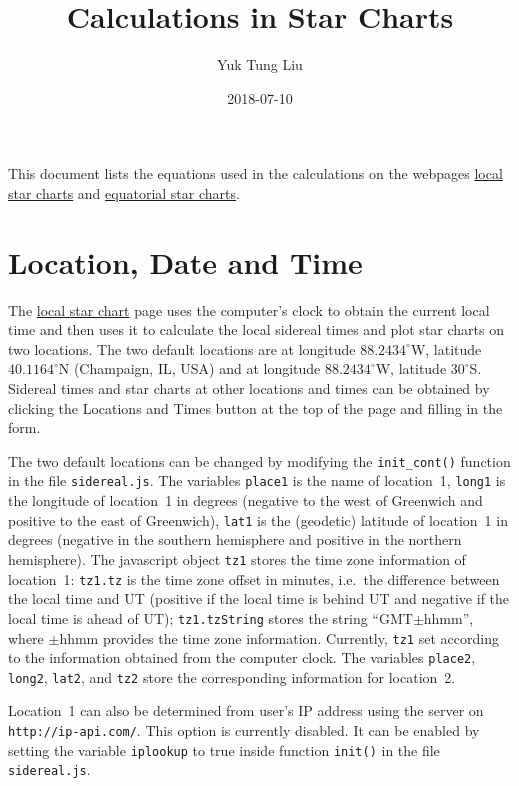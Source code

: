\documentclass[12pt]{article}
\begin{document}
\title{Calculations in Star Charts}
\author{Yuk Tung Liu}
\date{2018-07-10}
\maketitle

This document lists the equations used in the calculations 
on the webpages \href{../sidereal.html}{local star charts} and 
\href{../chartGCRS.html}{equatorial star charts}. 

\section{Location, Date and Time}

The \href{../sidereal.html}{local star chart} page uses the computer's 
clock to obtain the current local time and then uses it to calculate 
the local sidereal times and plot star charts on two locations. 
The two default locations are at longitude $88.2434^\circ$W, 
latitude $40.1164^\circ$N (Champaign, IL, USA) and at longitude $88.2434^\circ$W, 
latitude $30^\circ$S. Sidereal times and star charts at other locations 
and times can be obtained by clicking the Locations and Times button 
at the top of the page and filling in the form. 

The two default locations can be changed by modifying the {\tt init\_cont()} 
function in the file {\tt sidereal.js}. The variables {\tt place1} 
is the name of location~1, {\tt long1} is the longitude of location~1 
in degrees (negative to the west of Greenwich and positive to the east 
of Greenwich), {\tt lat1} is the (geodetic) latitude of location~1 in 
degrees (negative in the southern hemisphere and positive in the northern 
hemisphere). The javascript object {\tt tz1} stores the time zone information 
of location~1: {\tt tz1.tz} is the time zone offset in minutes, i.e.\ the difference 
between the local time and UT (positive if the local time is behind UT and 
negative if the local time is ahead of UT); {\tt tz1.tzString} stores the 
string ``GMT$\pm$hhmm'', where $\pm$hhmm provides the time zone information. 
Currently, {\tt tz1} set according to the information obtained from the computer clock. 
The variables {\tt place2}, {\tt long2}, {\tt lat2}, and {\tt tz2} 
store the corresponding information for location~2. 

Location~1 can also be determined from user's IP address using the server 
on {\tt http://ip-api.com/}. This option is currently disabled. It can be 
enabled by setting the variable {\tt iplookup} to true inside function {\tt init()} 
in the file {\tt sidereal.js}.
\end{document}
